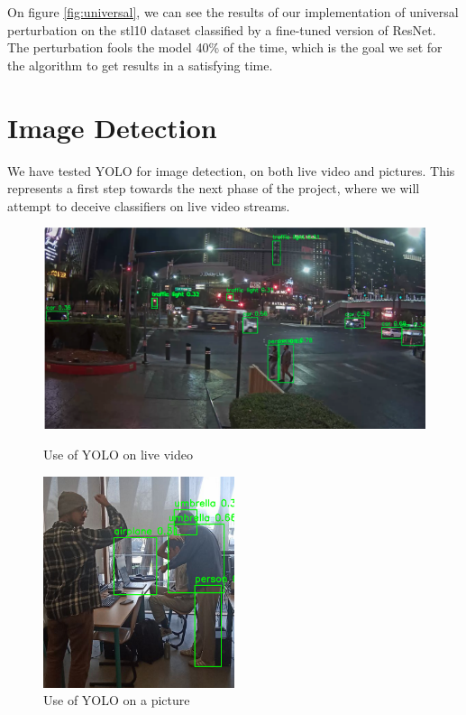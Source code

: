 \documentclass{article}
\begin{document}
On figure \ref{fig:universal}, we can see the results of our implementation of universal perturbation on the stl10 dataset classified by a fine-tuned version of ResNet. The perturbation fools the model 40\% of the time, which is the goal we set for the algorithm to get results in a satisfying time. 


\section{Image Detection}

We have tested YOLO for image detection, on both live video and pictures. 
This represents a first step towards the next phase of the project, where we will attempt to deceive classifiers on live video streams.


\begin{figure}[ht]
    \begin{minipage}[t]{0.49\textwidth}
        \centering
        \includegraphics[width=\textwidth]{results/YOLO-Video.png}
        \caption{Use of YOLO on live video}
        \label{fig:Yolo Video}
    \end{minipage}
    \hfill
    \begin{minipage}[t]{0.49\textwidth}
        \centering
        \includegraphics[width=0.5\textwidth]{results/YOLO-Photo.png}
        \caption{Use of YOLO on a picture}
        \label{fig:Yolo Photo}
    \end{minipage}
\end{figure}
\end{document}
